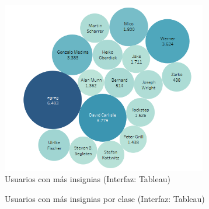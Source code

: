 \documentclass[a4paper, 12pt]{book}
\begin{document}
\begin{figure}[ht]
    \centering
    \includegraphics[width=0.8\textwidth]{img/tex/Popular_users_badges_tex.png}
    \caption{Usuarios con más insignias (Interfaz: Tableau)}
    \label{figura:badges_tex_top}
\end{figure}


\begin{figure}[ht]
 \centering
 \caption{Usuarios con más insignias por clase (Interfaz: Tableau)}
 \label{figura:badges_tex_class_top}
\end{figure}
\end{document}
